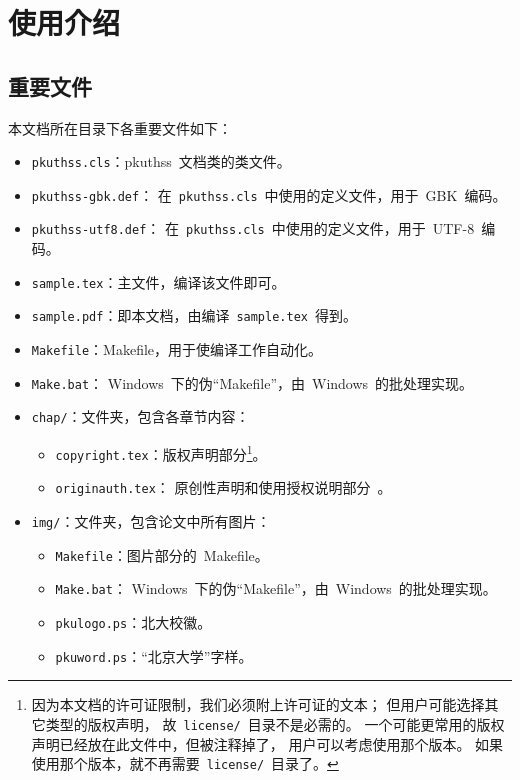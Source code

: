 \chapter{使用介绍}
	\section{重要文件}

	本文档所在目录下各重要文件如下：
	\begin{itemize}\denselist
		\item \verb|pkuthss.cls|：pkuthss~文档类的类文件。
		\item \verb|pkuthss-gbk.def|：
			在~\verb|pkuthss.cls|~中使用的定义文件，用于~GBK~编码。
		\item \verb|pkuthss-utf8.def|：
			在~\verb|pkuthss.cls|~中使用的定义文件，用于~UTF-8~编码。
		\item \verb|sample.tex|：主文件，编译该文件即可。
		\item \verb|sample.pdf|：即本文档，由编译~\verb|sample.tex|~得到。
		\item \verb|Makefile|：Makefile，用于使编译工作自动化。
		\item \verb|Make.bat|：
			Windows~下的伪“Makefile”，由~Windows~的批处理实现。
		\item \verb|chap/|：文件夹，包含各章节内容：
		\begin{itemize}\denselist
			\item \verb|copyright.tex|：版权声明部分\footnote%
			{%
				因为本文档的许可证限制，我们必须附上许可证的文本；
				但用户可能选择其它类型的版权声明，
				故~\texttt{license/}\linebreak[1]~目录不是必需的。
				一个可能更常用的版权声明已经放在此文件中，但被注释掉了，
				用户可以考虑使用那个版本。
				如果使用那个版本，就不再需要~\texttt{license/}~目录了。
			}。
			\item \verb|originauth.tex|：
				原创性声明和使用授权说明部分~\supercite{F11}。
		\end{itemize}
		\item \verb|img/|：文件夹，包含论文中所有图片：
		\begin{itemize}\denselist
			\item \verb|Makefile|：图片部分的~Makefile。
			\item \verb|Make.bat|：
				Windows~下的伪“Makefile”，由~Windows~的批处理实现。
			\item \verb|pkulogo.ps|：北大校徽。
			\item \verb|pkuword.ps|：“北京大学”字样。
		\end{itemize}
	\end{itemize}


